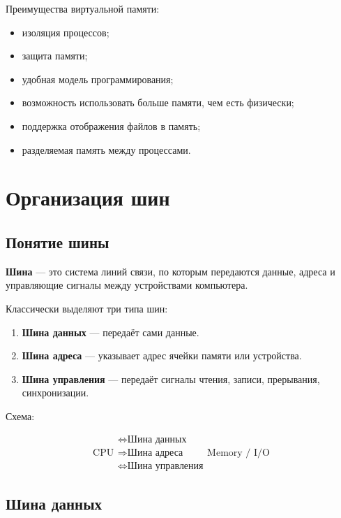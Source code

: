 \documentclass[12pt,a4paper]{article}
\theoremstyle{remark}
\begin{document}
Преимущества виртуальной памяти:
\begin{itemize}
    \item изоляция процессов;
    \item защита памяти;
    \item удобная модель программирования;
    \item возможность использовать больше памяти, чем есть физически;
    \item поддержка отображения файлов в память;
    \item разделяемая память между процессами.
\end{itemize}

\section{Организация шин}

\subsection{Понятие шины}

\textbf{Шина} --- это система линий связи, по которым передаются данные, адреса и управляющие сигналы между устройствами компьютера.

Классически выделяют три типа шин:

\begin{enumerate}
    \item \textbf{Шина данных} --- передаёт сами данные.
    \item \textbf{Шина адреса} --- указывает адрес ячейки памяти или устройства.
    \item \textbf{Шина управления} --- передаёт сигналы чтения, записи, прерывания, синхронизации.
\end{enumerate}

Схема:

\[
\boxed{\text{CPU}}
\begin{array}{c}
\Longleftrightarrow \boxed{\text{Шина данных}} \\
\Longrightarrow \boxed{\text{Шина адреса}} \\
\Longleftrightarrow \boxed{\text{Шина управления}}
\end{array}
\boxed{\text{Memory / I/O}}
\]

\subsection{Шина данных}
\end{document}
